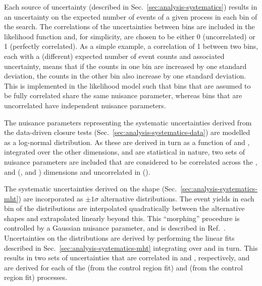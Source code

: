 Each source of uncertainty (described in Sec.~\ref{sec:analysis-systematics}) 
results in an uncertainty on the expected number of events of 
a given process in each bin of the search. 
The correlations of the uncertainties between bins are included in the 
likelihood function and, for simplicity, are chosen to be either 
0 (uncorrelated) or 1 (perfectly correlated). As a simple 
example, a correlation of 1 between two bins, each with a (different) expected 
number of event counts and associated uncertainty, means that if the counts in 
one bin are increased by one standard deviation, the counts in the other bin 
also increase by one standard deviation. This is implemented in the likelihood 
model such that bins that are assumed to be fully correlated share the same 
nuisance parameter, whereas bins that are uncorrelated have independent 
nuisance parameters.

The nuisance parameters representing the systematic uncertainties derived from 
the data-driven closure tests (Sec.~\ref{sec:analysis-systematics-data}) %
are modelled as a log-normal distribution. As these are derived in turn as a 
function of \njet and \scalht, integrated over the other dimensions, and are 
statistical in nature, two sets of nuisance parameters are included that are 
considered to be correlated across the \nb, 
\scalht and \mht (\njet, \nb and \mht) dimensions and uncorrelated in \njet 
(\scalht). 

The systematic uncertainties derived on the \mht shape 
(Sec.~\ref{sec:analysis-systematics-mht}) are incorporated as $\pm1\sigma$ 
alternative \mht distributions. The event yields in each bin of the 
distributions are interpolated quadratically between the alternative shapes and 
extrapolated linearly beyond this. This ``morphing'' procedure is controlled by 
a Gaussian nuisance parameter, and is described in Ref.~\cite{templatemorphing}.
Uncertainties on the \mht distributions are derived by performing 
the linear fits described in Sec.~\ref{sec:analysis-systematics-mht} 
integrating over \scalht and \njet in turn. This results in two sets of  
uncertainties that are correlated in \scalht and \njet, respectively, and are 
derived for each of the \znnj (from the \mmj control region fit) and \wlj (from 
the \mj control region fit) processes.

